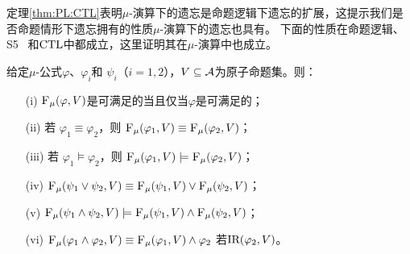 定理\ref{thm:PL:CTL}表明$\mu$-演算下的遗忘是命题逻辑下遗忘的扩展，这提示我们是否命题情形下遗忘拥有的性质$\mu$-演算下的遗忘也具有。
下面的性质在命题逻辑、S5~\cite{Yan:AIJ:2009} 和$\textrm{CTL}$中都成立，这里证明其在$\mu$-演算中也成立。
\begin{proposition}
	\label{chapter06:pro:ctl:forget:1}
	给定$\mu$-公式$\varphi$、$\varphi_i$和 $\psi_i$（$i=1,2$），$V\subseteq {\cal A}$为原子命题集。则：
	\begin{itemize}
		\item[(i)] ${\textsc{F}_{\textsc{$\mu$}}}(\varphi, V)$是可满足的当且仅当$\varphi$是可满足的；
		\item[(ii)] 若 $\varphi_1 \equiv \varphi_2$，则 ${\textsc{F}_{\textsc{$\mu$}}}(\varphi_1, V) \equiv {\textsc{F}_{\textsc{$\mu$}}}(\varphi_2, V)$；
		\item[(iii)] 若 $\varphi_1 \models \varphi_2$，则 ${\textsc{F}_{\textsc{$\mu$}}}(\varphi_1, V) \models {\textsc{F}_{\textsc{$\mu$}}}(\varphi_2, V)$；
		\item[(iv)] ${\textsc{F}_{\textsc{$\mu$}}}(\psi_1 \vee \psi_2, V) \equiv {\textsc{F}_{\textsc{$\mu$}}}(\psi_1, V) \vee {\textsc{F}_{\textsc{$\mu$}}}(\psi_2, V)$；
		\item[(v)] ${\textsc{F}_{\textsc{$\mu$}}}(\psi_1 \wedge \psi_2, V) \models {\textsc{F}_{\textsc{$\mu$}}}(\psi_1, V) \wedge {\textsc{F}_{\textsc{$\mu$}}}(\psi_2, V)$；
		\item[(vi)] ${\textsc{F}_{\textsc{$\mu$}}}(\varphi_1 \wedge \varphi_2, V) \equiv {\textsc{F}_{\textsc{$\mu$}}}(\varphi_1, V) \wedge \varphi_2$ 若$\textrm{IR}(\varphi_2, V)$。
	\end{itemize}
\end{proposition}
